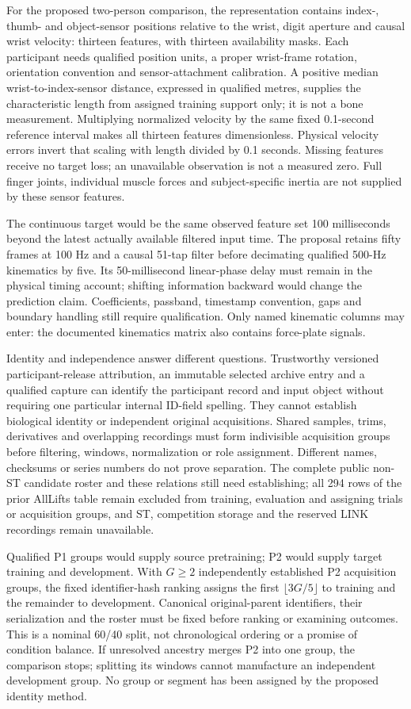 For the proposed two-person comparison, the representation contains index-, thumb- and object-sensor positions relative to the wrist, digit aperture and causal wrist velocity: thirteen features, with thirteen availability masks. Each participant needs qualified position units, a proper wrist-frame rotation, orientation convention and sensor-attachment calibration. A positive median wrist-to-index-sensor distance, expressed in qualified metres, supplies the characteristic length from assigned training support only; it is not a bone measurement. Multiplying normalized velocity by the same fixed 0.1-second reference interval makes all thirteen features dimensionless. Physical velocity errors invert that scaling with length divided by 0.1 seconds. Missing features receive no target loss; an unavailable observation is not a measured zero. Full finger joints, individual muscle forces and subject-specific inertia are not supplied by these sensor features.

The continuous target would be the same observed feature set 100 milliseconds beyond the latest actually available filtered input time. The proposal retains fifty frames at 100 Hz and a causal 51-tap filter before decimating qualified 500-Hz kinematics by five. Its 50-millisecond linear-phase delay must remain in the physical timing account; shifting information backward would change the prediction claim. Coefficients, passband, timestamp convention, gaps and boundary handling still require qualification. Only named kinematic columns may enter: the documented kinematics matrix also contains force-plate signals.

Identity and independence answer different questions. Trustworthy versioned participant-release attribution, an immutable selected archive entry and a qualified capture can identify the participant record and input object without requiring one particular internal ID-field spelling. They cannot establish biological identity or independent original acquisitions. Shared samples, trims, derivatives and overlapping recordings must form indivisible acquisition groups before filtering, windows, normalization or role assignment. Different names, checksums or series numbers do not prove separation. The complete public non-ST candidate roster and these relations still need establishing; all 294 rows of the prior AllLifts table remain excluded from training, evaluation and assigning trials or acquisition groups, and ST, competition storage and the reserved LINK recordings remain unavailable.

Qualified P1 groups would supply source pretraining; P2 would supply target training and development. With $G\geq2$ independently established P2 acquisition groups, the fixed identifier-hash ranking assigns the first $\lfloor3G/5\rfloor$ to training and the remainder to development. Canonical original-parent identifiers, their serialization and the roster must be fixed before ranking or examining outcomes. This is a nominal 60/40 split, not chronological ordering or a promise of condition balance. If unresolved ancestry merges P2 into one group, the comparison stops; splitting its windows cannot manufacture an independent development group. No group or segment has been assigned by the proposed identity method.

